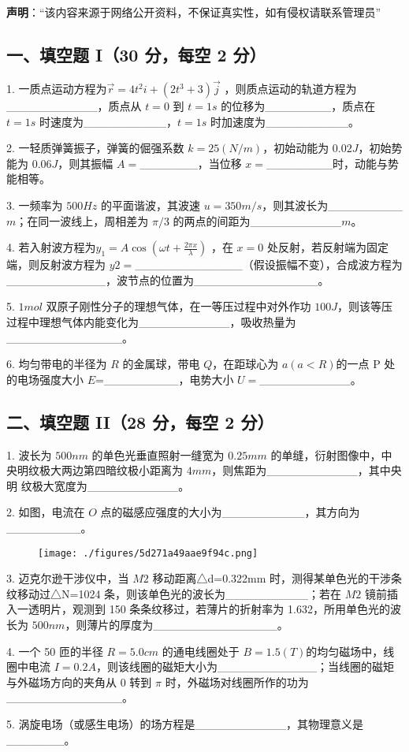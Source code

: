 
\textbf{声明}：“该内容来源于网络公开资料，不保证真实性，如有侵权请联系管理员”

\subsection{一、填空题 I（30 分，每空 2 分）}
1. 一质点运动方程为$\vec{r}=4t^2i+(2t^3+3)\vec{j}$ ，则质点运动的轨道方程为___________，质点从 $t=0$ 到 $t=1s$ 的位移为________，质点在 $t=1s$ 时速度为__________，$t=1s$ 时加速度为__________。

2. 一轻质弹簧振子，弹簧的倔强系数 $k=25(N/m)$，初始动能为 $0.02J$，初始势能为 $0.06J$，则其振幅 $A=$_______，当位移 $x=$________时，动能与势能相等。

3. 一频率为 $500Hz$ 的平面谐波，其波速 $u=350m/s$，则其波长为_________$m$；在同一波线上，周相差为 $\pi/3$ 的两点的间距为___________$m$。

4. 若入射波方程为$y_1=A\cos(\omega t+\frac{2\pi x}{\lambda})$ ，在 $x=0$ 处反射，若反射端为固定端，则反射波方程为 $y2=$_____________（假设振幅不变），合成波方程为____________，波节点的位置为_______________。

5. $1mol$ 双原子刚性分子的理想气体，在一等压过程中对外作功 $100J$，则该等压
过程中理想气体内能变化为___________，吸收热量为______________。

6. 均匀带电的半径为 $R$ 的金属球，带电 $Q$，在距球心为 $a(a<R)$的一点 P 处
的电场强度大小 $E$=_________，电势大小 $U=$___________。
\subsection{二、填空题 II（28 分，每空 2 分）}
1. 波长为 $500nm$ 的单色光垂直照射一缝宽为 $0.25mm$ 的单缝，衍射图像中，中
央明纹极大两边第四暗纹极小距离为 $4mm$，则焦距为___________，其中央明
纹极大宽度为___________。

2. 如图，电流在 $O$ 点的磁感应强度的大小为__________，其方向为_________。
\begin{figure}[ht]
\centering
\texttt{[image: ./figures/5d271a49aae9f94c.png]}
\caption{} \label{fig_NJUB07_1}
\end{figure}
3. 迈克尔逊干涉仪中，当 $M2$ 移动距离△d=0.322mm 时，测得某单色光的干涉条纹移动过△N=1024 条，则该单色光的波长为__________；若在 $M2$ 镜前插入一透明片，观测到 150 条条纹移过，若薄片的折射率为 1.632，所用单色光的波长为 $500nm$，则薄片的厚度为_______________。

4. 一个 50 匝的半径 $R=5.0cm$ 的通电线圈处于 $B=1.5(T)$的均匀磁场中，线圈中电流 $I=0.2A$，则该线圈的磁矩大小为____________；当线圈的磁矩与外磁场方向的夹角从 0 转到 $\pi$ 时，外磁场对线圈所作的功为______________。

5. 涡旋电场（或感生电场）的场方程是___________，其物理意义是_______。